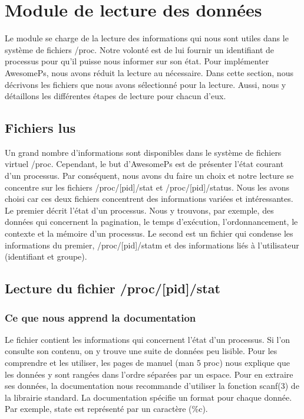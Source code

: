 \section{Module de lecture des données}
Le module se charge de la lecture des informations qui nous sont utiles dans le système de fichiers /proc. Notre volonté est de lui fournir un identifiant de processus pour qu'il puisse nous informer sur son état. Pour implémenter AwesomePs, nous avons réduit la lecture au nécessaire. Dans cette section, nous décrivons les fichiers que nous avons sélectionné pour la lecture. Aussi, nous y détaillons les différentes étapes de lecture pour chacun d'eux.

\subsection{Fichiers lus}
Un grand nombre d'informations sont disponibles dans le système de fichiers virtuel /proc. Cependant, le but d'AwesomePs est de présenter l'état courant d'un processus. Par conséquent, nous avons du faire un choix et notre lecture se concentre sur les fichiers /proc/[pid]/stat et /proc/[pid]/status. Nous les avons choisi car ces deux fichiers concentrent des informations variées et intéressantes. Le premier décrit l'état d'un processus. Nous y trouvons, par exemple, des données qui concernent la pagination, le temps d'exécution, l'ordonnancement, le contexte et la mémoire d'un processus. Le second est un fichier qui condense les informations du premier, /proc/[pid]/statm et des informations liés à l'utilisateur (identifiant et groupe).

\subsection{Lecture du fichier /proc/[pid]/stat}
\subsubsection{Ce que nous apprend la documentation}
Le fichier contient les informations qui concernent l’état d'un processus. Si l'on consulte son contenu, on y trouve une suite de données peu lisible.
Pour les comprendre et les utiliser, les pages de manuel (man 5 proc) nous explique que les données y sont rangées dans l'ordre séparées par un espace. Pour en extraire ses données, la documentation nous recommande d'utiliser la fonction scanf(3) de la librairie standard. La documentation spécifie un format pour chaque donnée. Par exemple, state est représenté par un caractère (\%c).

